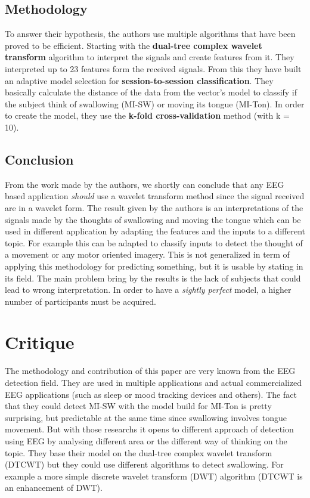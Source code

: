 \documentclass[a4paper, 12pt, english]{article}
\begin{document}
\subsection{Methodology}
To answer their hypothesis, the authors use multiple algorithms that have been proved to be efficient. Starting with the \textbf{dual-tree complex wavelet transform} algorithm to interpret the signals and create features from it. They interpreted up to 23 features form the received signals. From this they have built an adaptive model selection for \textbf{session-to-session classification}. They basically calculate the distance of the data from the vector's model to classify if the subject think of swallowing (MI-SW) or moving its tongue (MI-Ton). In order to create the model, they use the \textbf{k-fold cross-validation} method (with k = 10).

\subsection{Conclusion}
From the work made by the authors, we shortly can conclude that any EEG based application \textit{should} use a wavelet transform method since the signal received are in a wavelet form. The result given by the authors is an interpretations of the signals made by the thoughts of swallowing and moving the tongue which can be used in different application by adapting the features and the inputs to a different topic. For example this can be adapted to classify inputs to detect the thought of a movement or any motor oriented imagery. This is not generalized in term of applying this methodology for predicting something, but it is usable by stating in its field. The main problem bring by the results is the lack of subjects that could lead to wrong interpretation. In order to have a \textit{sightly perfect} model, a higher number of participants must be acquired.

\section{Critique}
The methodology and contribution of this paper are very known from the EEG detection field. They are used in multiple applications and actual commercialized EEG applications (such as sleep or mood tracking devices and others). The fact that they could detect MI-SW with the model build for MI-Ton is pretty surprising, but predictable at the same time since swallowing involves tongue movement. But with those researchs it opens to different approach of detection using EEG by analysing different area or the different way of thinking on the topic. They base their model on the dual-tree complex wavelet transform (DTCWT) but they could use different algorithms to detect swallowing. For example a more simple discrete wavelet transform (DWT) algorithm (DTCWT is an enhancement of  DWT).
\end{document}
